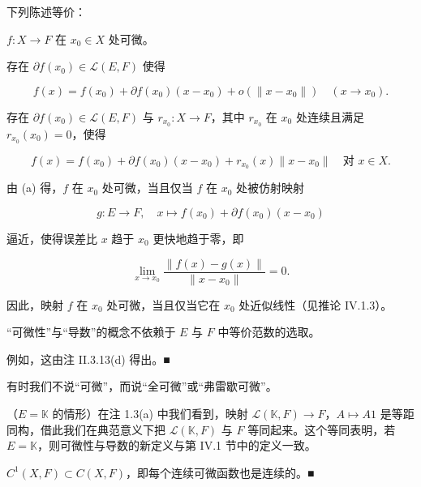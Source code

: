 \begin{remark}

\begin{items}
\item

下列陈述等价：

\begin{subitems}
\item

$ f : X \to F $ 在 $ x_0 \in X $ 处可微。

\item

存在 $ \partial f(x_0) \in \mathcal{L}(E, F) $ 使得

\[
f(x) = f(x_0) + \partial f(x_0)(x - x_0) + o(\|x - x_0\|) \quad (x \to x_0) .
\]
\item

存在 $ \partial f(x_0) \in \mathcal{L}(E, F) $ 与 $ r_{x_0} : X \to F $，其中 $ r_{x_0} $ 在 $ x_0 $ 处连续且满足 $ r_{x_0}(x_0) = 0 $，使得

\[
f(x) = f(x_0) + \partial f(x_0)(x - x_0) + r_{x_0}(x) \|x - x_0\| \quad \text{对 } x \in X .
\]
\end{subitems}

\item

由 (a) 得，$ f $ 在 $ x_0 $ 处可微，当且仅当 $ f $ 在 $ x_0 $ 处被仿射映射

\[
g : E \to F , \quad x \mapsto f(x_0) + \partial f(x_0)(x - x_0)
\]

逼近，使得误差比 $ x $ 趋于 $ x_0 $ 更快地趋于零，即

\[
\lim_{x \to x_0} \frac{\|f(x) - g(x)\|}{\|x - x_0\|} = 0 .
\]

因此，映射 $ f $ 在 $ x_0 $ 处可微，当且仅当它在 $ x_0 $ 处近似线性（见推论 IV.1.3）。

\item

“可微性”与“导数”的概念不依赖于 $ E $ 与 $ F $ 中等价范数的选取。

\proofhead
例如，这由注 II.3.13(d) 得出。\nobreak\hspace{0.35em}■
\item

有时我们不说“可微”，而说“全可微”或“弗雷歇可微”。

\item

（$ E = \mathbb{K} $ 的情形）在注 1.3(a) 中我们看到，映射 $ \mathcal{L}(\mathbb{K}, F) \to F $，$ A \mapsto A1 $ 是等距同构，借此我们在典范意义下把 $ \mathcal{L}(\mathbb{K}, F) $ 与 $ F $ 等同起来。这个等同表明，若 $ E = \mathbb{K} $，则可微性与导数的新定义与第 IV.1 节中的定义一致。

\item

$ C^1(X, F) \subset C(X, F) $，即每个连续可微函数也是连续的。\nobreak\hspace{0.35em}■

\end{items}

\end{remark}

